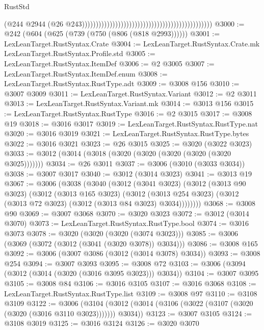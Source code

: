 \begin{lexlean}{RustStd}
\begin{coremodule}
                                                                                              (@244
                                                                                                @2944
                                                                                                (@26
                                                                                                  @243)))))))))))))))))))))))))))))))))))))))))))))))
@3000 := @242 (@604 (@625 (@739 (@750 (@806 (@818 @2993))))))
@3001 := LexLeanTarget.RustSyntax.Crate
@3004 := LexLeanTarget.RustSyntax.Crate.mk LexLeanTarget.RustSyntax.Profile.std
@3005 := LexLeanTarget.RustSyntax.ItemDef
@3006 := @2 @3005
@3007 := LexLeanTarget.RustSyntax.ItemDef.enum
@3008 := LexLeanTarget.RustSyntax.RustType.adt
@3009 := @3008 @156
@3010 := @3007 @3009
@3011 := LexLeanTarget.RustSyntax.Variant
@3012 := @2 @3011
@3013 := LexLeanTarget.RustSyntax.Variant.mk
@3014 := @3013 @156
@3015 := LexLeanTarget.RustSyntax.RustType
@3016 := @2 @3015
@3017 := @3008 @19
@3018 := @3016 @3017
@3019 := LexLeanTarget.RustSyntax.RustType.nat
@3020 := @3016 @3019
@3021 := LexLeanTarget.RustSyntax.RustType.bytes
@3022 := @3016 @3021
@3023 := @26 @3015
@3025 := @3020 (@3022 @3023)
@3033 := @3012 (@3014 (@3018 (@3020 (@3020 (@3020 (@3020 (@3020 @3025)))))))
@3034 := @26 @3011
@3037 := @3006 (@3010 (@3033 @3034))
@3038 := @3007 @3017
@3040 := @3012 (@3014 @3023)
@3041 := @3013 @19
@3067 := @3006
    (@3038
      (@3040
        (@3012
          (@3041 @3023)
          (@3012
            (@3013 @90 @3023)
            (@3012
              (@3013 @165 @3023)
              (@3012
                (@3013 @254 @3023)
                (@3012 (@3013 @72 @3023) (@3012 (@3013 @84 @3023) @3034))))))))
@3068 := @3008 @90
@3069 := @3007 @3068
@3070 := @3020 @3023
@3072 := @3012 (@3014 @3070)
@3073 := LexLeanTarget.RustSyntax.RustType.bool
@3074 := @3016 @3073
@3078 := @3020 (@3020 (@3020 (@3074 @3023)))
@3085 := @3006 (@3069 (@3072 (@3012 (@3041 (@3020 @3078)) @3034)))
@3086 := @3008 @165
@3092 := @3006 (@3007 @3086 (@3012 (@3014 @3078) @3034))
@3093 := @3008 @254
@3094 := @3007 @3093
@3095 := @3008 @72
@3103 := @3006 (@3094 (@3012 (@3014 (@3020 (@3016 @3095 @3023))) @3034))
@3104 := @3007 @3095
@3105 := @3008 @84
@3106 := @3016 @3105
@3107 := @3016 @3068
@3108 := LexLeanTarget.RustSyntax.RustType.list
@3109 := @3008 @97
@3110 := @3108 @3109
@3122 := @3006
    (@3104 (@3012 (@3014 (@3106 (@3022 (@3107 (@3020 (@3020 (@3016 @3110 @3023))))))) @3034))
@3123 := @3007 @3105
@3124 := @3108 @3019
@3125 := @3016 @3124
@3126 := @3020 @3070

\end{coremodule}
\end{lexlean}
